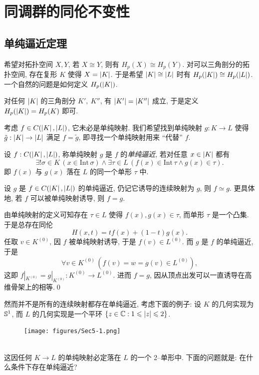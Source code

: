 
\section{同调群的同伦不变性}

\subsection{单纯逼近定理}

希望对拓扑空间 $ X, Y $, 若 $ X\cong Y $, 则有 $ H_p(X)\cong H_p(Y) $. 对可以三角剖分的拓扑空间, 存在复形 $ K $ 使得 $ X=\abs{K} $. 于是希望 $ \abs{K}\cong\abs{L} $ 时有 $ H_p(\abs{K})\cong H_p(\abs{L}) $. 一个自然的问题是如何定义 $ H_p(\abs{K}) $.

对任何 $ \abs{K} $ 的三角剖分 $ K',\ K'' $, 有 $ \abs{K'}=\abs{K''} $ 成立, 于是定义 $ H_p(\abs{K})=H_p(K) $ 即可.

考虑 $ f\in C(\abs{K},\abs{L}) $, 它未必是单纯映射. 我们希望找到单纯映射 $ g : K\to L $ 使得 $ \tilde{g} : \abs{K}\to\abs{L} $ 满足 $ f=\tilde{g} $, 即寻找一个单纯映射用来 ``代替'' $ f $.

\begin{Definition}[单纯逼近]
	设 $ f : C(\abs{K},\abs{L}) $, 称单纯映射 $ g $ 是 $ f $ 的\emph{单纯逼近}, 若对任意 $ x\in\abs{K} $ 都有
	\[
		\exists!\sigma\in K\,(x\in\mathrm{Int}\,\sigma)\land\exists\tau\in L\,(f(x)\in\mathrm{Int}\,\tau\land g(x)\in\tau).
	\]
	即 $ f(x) $ 与 $ g(x) $ 落在 $ L $ 的同一个单形 $ \tau $ 中.
\end{Definition}

\begin{Proposition}
	设 $ g $ 是 $ f\in C(\abs{K},\abs{L}) $ 的单纯逼近, 仍记它诱导的连续映射为 $ g $, 则 $ f\simeq g $. 更具体地, 若 $ f $ 可以被单纯映射诱导, 则 $ f=g $.
\end{Proposition}
\begin{Proof}
	由单纯映射的定义可知存在 $ \tau\in L $ 使得 $ f(x),g(x)\in\tau $, 而单形 $ \tau $ 是一个凸集. 于是总存在同伦
	\[
		H(x,t)=tf(x)+(1-t)g(x).
	\]
	任取 $ v\in K^{(0)} $, 因 $ f $ 被单纯映射诱导, 于是 $ f(v)\in L^{(0)} $. 而 $ g $ 是 $ f $ 的单纯逼近, 于是
	\[
		\forall v\in K^{(0)}\,(f(v)=w=g(v)\in L^{(0)}),
	\]
	这即 $ f|_{K^{(0)}}=g|_{K^{(0)}} : K^{(0)}\to L^{(0)} $. 进而 $ f=g $, 因从顶点出发可以一直诱导在高维骨架上的相等.\qed
\end{Proof}

然而并不是所有的连续映射都存在单纯逼近, 考虑下面的例子: 设 $ K $ 的几何实现为 $ \S^1 $, 而 $ L $ 的几何实现是一个平环 $ \set{z\in\C : 1\leqslant\abs{z}\leqslant 2} $.
\begin{figure}[htbp]
	\centering
	\texttt{[image: figures/Sec5-1.png]}
\end{figure}~\\
这因任何 $ K\to L $ 的单纯映射必定落在 $ L $ 的一个 2--单形中. 下面的问题就是: 在什么条件下存在单纯逼近?

